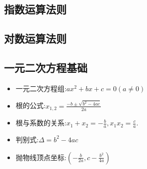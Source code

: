 \documentclass[12pt, a4paper, oneside, UTF8]{ctexbook}  %
\begin{document}
\subsection{指数运算法则}
\begin{center}
\end{center}
\subsection{对数运算法则}
\begin{center}
\end{center}
\subsection{一元二次方程基础}
\begin{itemize}
    \item 一元二次方程组:$a x^2 +bx+c=0(a \neq 0)$
    \item 根的公式:$x_{1,2}=\frac{-b\pm\sqrt{b^2-4ac}}{2a}$
    \item 根与系数的关系:$x_{1}+x_{2}=-\frac{b}{a},x_{1}x_{2}=\frac{c}{a}.$
    \item 判别式:$\Delta=b^2-4ac$
    \item 抛物线顶点坐标:$(-\frac{b}{2a},c-\frac{b^2}{4a})$
\end{itemize}
\end{document}
